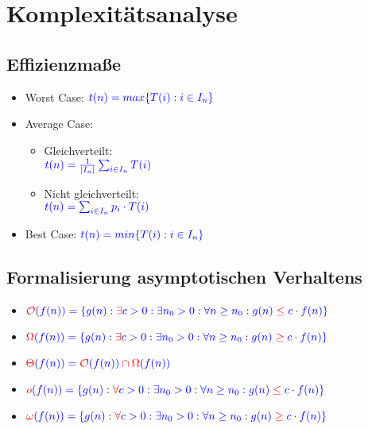 \documentclass[12pt,a4paper]{article}
\author{Jonas Schulz}
\begin{document}
\section{Komplexitätsanalyse}
\subsection{Effizienzmaße}
\begin{itemize}
\item Worst Case: $\color{blue}t(n)=max\{T(i):i\in I_n\}$
\item Average Case: \begin{itemize}
\item Gleichverteilt:\\
$\color{blue}t(n)=\frac{1}{\vert I_n \vert}\sum_{i\in I_n}T(i)$
\item Nicht gleichverteilt:\\
$\color{blue}t(n)=\sum_{i\in I_n}p_i\cdot T(i)$
\end{itemize}
\item Best Case: $\color{blue}t(n)=min\{T(i):i\in I_n\}$
\end{itemize}
\subsection{Formalisierung asymptotischen Verhaltens}
\begin{itemize}
\item $\color{red}\mathcal{O}\color{blue}(f(n)) = \{ g(n):\color{red}\exists\color{blue} c>0: \exists n_0>0: \forall n\geq n_0: g(n)\color{red}\leq\color{blue} c\cdot f(n)\}$
\item $\color{red}\Omega\color{blue}(f(n)) = \{ g(n):\color{red}\exists\color{blue} c>0: \exists n_0>0: \forall n\geq n_0: g(n)\color{red}\geq\color{blue} c\cdot f(n)\}$
\item $\color{red}\Theta \color{blue}(f(n)) = \color{red}\mathcal{O}\color{blue}(f(n)) \color{red}\cap\Omega \color{blue}(f(n))$
\item $\color{red}o\color{blue}(f(n)) = \{ g(n):\color{red}\forall\color{blue} c>0: \exists n_0>0: \forall n\geq n_0: g(n)\color{red}\leq\color{blue} c\cdot f(n)\}$
\item $\color{red}\omega\color{blue}(f(n)) = \{ g(n):\color{red}\forall\color{blue} c>0: \exists n_0>0: \forall n\geq n_0: g(n)\color{red}\geq\color{blue} c\cdot f(n)\}$
\end{itemize}
\end{document}
